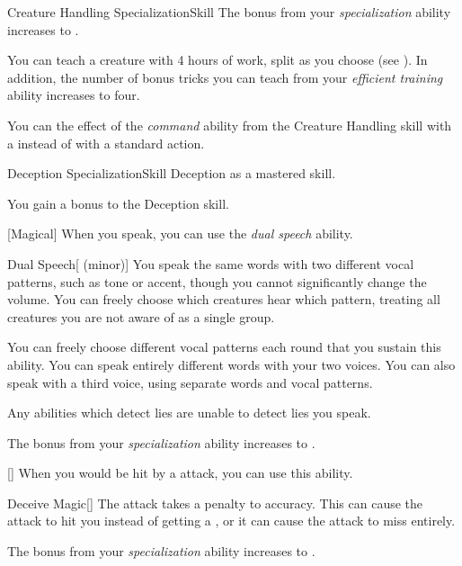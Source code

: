 \begin{feat}{Creature Handling Specialization}{Skill}
         The bonus from your \textit{specialization} ability increases to .

         You can teach a creature with 4 hours of work, split as you choose (see ).
        In addition, the number of bonus tricks you can teach from your \textit{efficient training} ability increases to four.

         You can  the effect of the \textit{command} ability from the Creature Handling skill with a  instead of with a standard action.
    \end{feat}

    \begin{feat}{Deception Specialization}{Skill}
        \featpre Deception as a mastered skill.

         You gain a  bonus to the Deception skill.

        [Magical] When you speak, you can use the \textit{dual speech} ability.
        \begin{freeability}{Dual Speech}[ (minor)]
            You speak the same words with two different vocal patterns, such as tone or accent, though you cannot significantly change the volume.
            You can freely choose which creatures hear which pattern, treating all creatures you are not aware of as a single group. 

            You can freely choose different vocal patterns each round that you sustain this ability.
            \rankline
             You can speak entirely different words with your two voices.
             You can also speak with a third voice, using separate words and vocal patterns.
        \end{freeability}

         Any  abilities which detect lies are unable to detect lies you speak.

         The bonus from your \textit{specialization} ability increases to .

        [] When you would be hit by a  attack, you can use this ability.
        \begin{apability}{Deceive Magic}[]
            The attack takes a  penalty to accuracy.
            This can cause the attack to hit you instead of getting a , or it can cause the attack to miss entirely.
        \end{apability}

         The bonus from your \textit{specialization} ability increases to .
    \end{feat}

